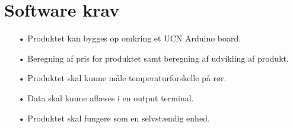 \section{Software krav}
\begin{enumerate}
	\item[•]Produktet kan bygges op omkring et UCN Arduino board.
	\item[•]Beregning af pris for produktet samt beregning af udvikling af       produkt.
	\item[•]Produktet skal kunne måle temperaturforskelle på rør.
	\item[•]Data skal kunne aflæses i en output terminal.
	\item[•]Produktet skal fungere som en selvstændig enhed.
\end{enumerate}
